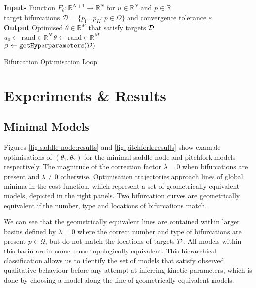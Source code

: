 \begin{algorithm*}[H]
\label{alg:optimisation-loop}
\SetAlgoLined
\textbf{Inputs} Function $F_{\theta}:\mathbb{R}^{N+1}\rightarrow\mathbb{R}^{N}$ for $u\in\mathbb{R}^N$ and $p\in\mathbb{R}$\\ target bifurcations $\mathcal{D}=\{p_1\dots p_K:p\in\Omega\}$ and convergence tolerance $\varepsilon$\\
\textbf{Output} Optimised $\theta\in\mathbb{R}^M$ that satisfy targets $\mathcal{D}$\\
$u_0\leftarrow\mathrm{rand}\in\mathbb{R}^{N}$\quad\,$\theta\leftarrow\mathrm{rand}\in\mathbb{R}^{M}$\\
$\beta\leftarrow\texttt{getHyperparameters}(\mathcal{D})$\\
\caption{Bifurcation Optimisation Loop}
\end{algorithm*}

\section{Experiments \& Results}

\subsection{Minimal Models}
Figures \ref{fig:saddle-node:results} and \ref{fig:pitchfork:results} show example optimisations of $(\theta_1,\theta_2)$ for the minimal saddle-node and pitchfork models respectively. The magnitude of the correction factor $\lambda=0$ when bifurcations are present and $\lambda\neq0$ otherwise. Optimisation trajectories approach lines of global minima in the cost function, which represent a set of geometrically equivalent models, depicted in the right panels. Two bifurcation curves are geometrically equivalent if the number, type and locations of bifurcations match.

We can see that the geometrically equivalent lines are contained within larger basins defined by $\lambda=0$ where the correct number and type of bifurcations are present $p\in\Omega$, but do not match the locations of targets $\mathcal{D}$. All models within this basin are in some sense topologically equivalent. This hierarchical classification allows us to identify the set of models that satisfy observed qualitative behaviour \cite{Stumpf2019ParameterBifurcations} before any attempt at inferring kinetic parameters, which is done by choosing a model along the line of geometrically equivalent models.

